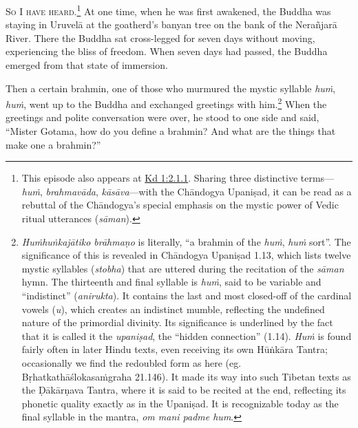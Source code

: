 \documentclass[12pt,openany]{book}%
\newcommand*{\scevam}[1]{\textsc{#1}}
\begin{document}
\scevam{So I have heard.\footnote{This episode also appears at \href{https://suttacentral.net/pli-tv-kd1/en/sujato\#2.1.1}{Kd 1:2.1.1}. Sharing three distinctive terms—\textit{\textsanskrit{huṁ}}, \textit{\textsanskrit{brahmavāda}}, \textit{\textsanskrit{kāsāva}}—with the \textsanskrit{Chāndogya} \textsanskrit{Upaniṣad}, it can be read as a rebuttal of the \textsanskrit{Chāndogya}’s special emphasis on the mystic power of Vedic ritual utterances (\textit{\textsanskrit{sāman}}). } }At one time, when he was first awakened, the Buddha was staying in \textsanskrit{Uruvelā} at the goatherd’s banyan tree on the bank of the \textsanskrit{Nerañjarā} River. There the Buddha sat cross-legged for seven days without moving, experiencing the bliss of freedom. When seven days had passed, the Buddha emerged from that state of immersion. 

Then a certain brahmin, one of those who murmured the mystic syllable \textit{\textsanskrit{huṁ}}, \textit{\textsanskrit{huṁ}}, went up to the Buddha and exchanged greetings with him.\footnote{\textit{\textsanskrit{Huṁhuṅkajātiko} \textsanskrit{brāhmaṇo}} is literally, “a brahmin of the \textit{\textsanskrit{huṁ}}, \textit{\textsanskrit{huṁ}} sort”. The significance of this is revealed in \textsanskrit{Chāndogya} \textsanskrit{Upaniṣad} 1.13, which lists twelve mystic syllables (\textit{stobha}) that are uttered during the recitation of the \textit{\textsanskrit{sāman}} hymn. The thirteenth and final syllable is \textit{\textsanskrit{huṁ}}, said to be variable and “indistinct” (\textit{anirukta}). It contains the last and most closed-off of the cardinal vowels (\textit{u}), which creates an indistinct mumble, reflecting the undefined nature of the primordial divinity. Its significance is underlined by the fact that it is called it the \textit{\textsanskrit{upaniṣad}}, the “hidden connection” (1.14). \textit{\textsanskrit{Huṁ}} is found fairly often in later Hindu texts, even receiving its own \textsanskrit{Hūṅkāra} Tantra; occasionally we find the redoubled form as here (eg. \textsanskrit{Bṛhatkathāślokasaṁgraha} 21.146). It made its way into such Tibetan texts as the \textsanskrit{Ḍākārṇava} Tantra, where it is said to be recited at the end, reflecting its phonetic quality exactly as in the \textsanskrit{Upaniṣad}. It is recognizable today as the final syllable in the mantra, \textit{om mani padme hum}. } When the greetings and polite conversation were over, he stood to one side and said, “Mister Gotama, how do you define a brahmin? And what are the things that make one a brahmin?” 
\end{document}
